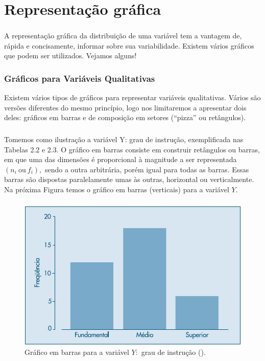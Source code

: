 \documentclass[14pt,aspectratio=1610]{beamer}
\begin{document}
\section{Representação gráfica}
\begin{frame}{}
\frametitle{}
\begin{block}{}
\justifying
A representação gráfica da distribuição de uma variável tem a vantagem de, rápida e concisamente, informar sobre sua variabilidade. Existem vários gráficos que podem ser utilizados. Vejamos alguns!
\end{block}
\end{frame}

\begin{frame}{}
\frametitle{Gráficos para Variáveis Qualitativas}
\begin{block}{}
\justifying
Existem vários tipos de gráficos para representar variáveis qualitativas. Vários são
versões diferentes do mesmo princípio, logo nos limitaremos a apresentar dois deles:
gráficos em barras e de composição em setores (“pizza” ou retângulos).
\end{block}
\end{frame}

\begin{frame}{}
\frametitle{}
\begin{block}{}
\justifying
Tomemos como ilustração a variável Y: grau de instrução, exemplificada
nas Tabelas 2.2 e 2.3. O gráfico em barras consiste em construir retângulos ou barras,
em que uma das dimensões é proporcional à magnitude a ser representada $(n_{i}\ \textrm{ou}\ f_{i}),$ sendo a outra arbitrária, porém igual para todas as barras. Essas barras são dispostas paralelamente umas às outras, horizontal ou verticalmente. Na próxima Figura temos o gráfico em barras (verticais) para a variável $Y.$
\end{block}
\end{frame}

\begin{frame}{}
\frametitle{}
\begin{block}{}
\justifying
\begin{figure}[H]
    \centering
    \includegraphics[scale=0.5]{Fig3}
    \caption{Gráfico em barras para a variável $Y:$ grau de instrução (\cite{Morettin09}).}
    \label{Fig3_ex}
  \end{figure}
\end{block}
\end{frame}
\end{document}

